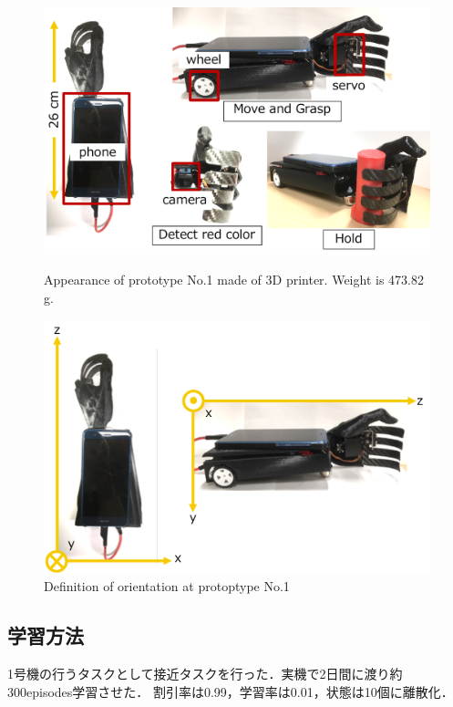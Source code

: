 \begin{figure}
    \centering
    \begin{minipage}{\linewidth}
        \centering
        \includegraphics[width=\linewidth]{figure/chapter3/1号機外観}
        \caption{Appearance of prototype No.1 made of 3D printer. Weight is 473.82 g.}
        \label{fig:1号機外観}
    \end{minipage}
    \begin{minipage}{\linewidth}
        \centering
        \includegraphics[width=0.9\linewidth]{figure/chapter3/1号機向き}
        \caption{Definition of orientation at protoptype No.1}
        \label{fig:1号機向き}
    \end{minipage}
\end{figure}


\subsection{学習方法}
1号機の行うタスクとして接近タスクを行った．実機で2日間に渡り約300episodes学習させた．
割引率は0.99，学習率は0.01，状態は10個に離散化．


